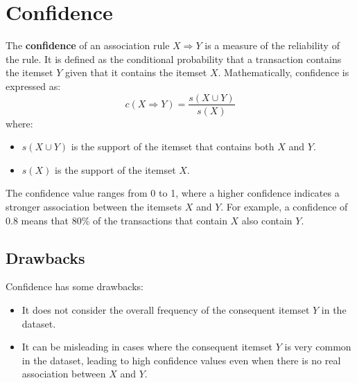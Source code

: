\section{Confidence}
The \textbf{confidence} of an association rule $X \Rightarrow Y$ is a measure of the reliability of the rule. It is defined as the conditional probability that a transaction contains the itemset $Y$ given that it contains the itemset $X$. Mathematically, confidence is expressed as:
\[c(X \Rightarrow Y) = \frac{s(X \cup Y)}{s(X)}\]
where:
\begin{itemize}
   \item $s(X \cup Y)$ is the support of the itemset that contains both $X$ and $Y$.
   \item $s(X)$ is the support of the itemset $X$.
\end{itemize}

The confidence value ranges from 0 to 1, where a higher confidence indicates a stronger association between the itemsets $X$ and $Y$. For example, a confidence of 0.8 means that 80\% of the transactions that contain $X$ also contain $Y$.

\subsection{Drawbacks}

Confidence has some drawbacks:
\begin{itemize}
   \item It does not consider the overall frequency of the consequent itemset $Y$ in the dataset.
   \item It can be misleading in cases where the consequent itemset $Y$ is very common in the dataset, leading to high confidence values even when there is no real association between $X$ and $Y$.
\end{itemize}

